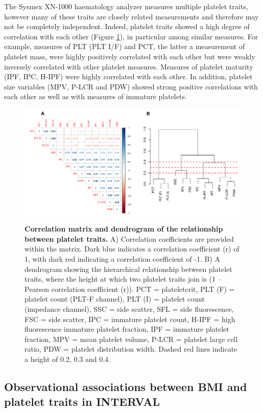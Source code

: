 \documentclass[11pt,twoside]{bristolthesis}
\begin{document}
The Sysmex XN-1000 haematology analyzer measures multiple platelet traits, however many of these traits are closely related measurements and therefore may not be completely independent. Indeed, platelet traits showed a high degree of correlation with each other (Figure \ref{fig:Corr-mat-dend}), in particular among similar measures. For example, measures of PLT (PLT I/F) and PCT, the latter a measurement of platelet mass, were highly positively correlated with each other but were weakly inversely correlated with other platelet measures. Measures of platelet maturity (IPF, IPC, H-IPF) were highly correlated with each other. In addition, platelet size variables (MPV, P-LCR and PDW) showed strong positive correlations with each other as well as with measures of immature platelets.



\begin{figure}
\includegraphics[width=0.95\linewidth]{figure/BMI_platelets/Corrmatrix_dendrogram} \caption[Correlation matrix and dendrogram of the relationship between platelet traits]{\textbf{Correlation matrix and dendrogram of the relationship between platelet traits.} A) Correlation coefficients are provided within the matrix. Dark blue indicates a correlation coefficient (r) of 1, with dark red indicating a correlation coefficient of -1. B) A dendrogram showing the hierarchical relationship between platelet traits, where the height at which two platelet traits join is (1 -- Pearson correlation coefficient (r)). PCT = plateletcrit, PLT (F) = platelet count (PLT-F channel), PLT (I) = platelet count (impedance channel), SSC = side scatter, SFL = side fluorescence, FSC = side scatter, IPC = immature platelet count, H-IPF = high fluorescence immature platelet fraction, IPF = immature platelet fraction, MPV = mean platelet volume, P-LCR = platelet large cell ratio, PDW = platelet distribution width. Dashed red lines indicate a height of 0.2, 0.3 and 0.4.}\label{fig:Corr-mat-dend}
\end{figure}
\hypertarget{observational-associations-between-bmi-and-platelet-traits-in-interval}{%
\subsection{Observational associations between BMI and platelet traits in INTERVAL}\label{observational-associations-between-bmi-and-platelet-traits-in-interval}}
\end{document}
